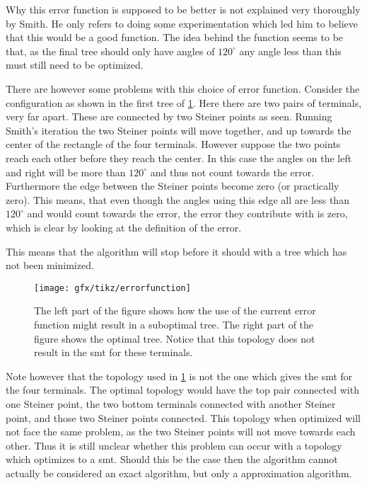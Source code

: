 Why this error function is supposed to be better is not explained very
thoroughly by Smith. He only refers to doing some experimentation which led him
to believe that this would be a good function. The idea behind the function
seems to be that, as the final tree should only have angles of $120^{\circ}$ any
angle less than this must still need to be optimized.

There are however some problems with this choice of error function. Consider
the configuration as shown in the first tree of \cref{fig:error-function}. Here
there are two pairs of terminals, very far apart. These are connected by two
Steiner points as seen. Running Smith's iteration the two Steiner points will
move together, and up towards the center of the rectangle of the four
terminals. However suppose the two points reach each other before they reach
the center. In this case the angles on the left and right will be more than
$120^{\circ}$ and thus not count towards the error. Furthermore the edge
between the Steiner points become zero (or practically zero). This means, that
even though the angles using this edge all are less than $120^{\circ}$ and would
count towards the error, the error they contribute with is zero, which is clear
by looking at the definition of the error.

This means that the algorithm will stop before it should with a tree which has
not been minimized.

\begin{figure}[htbp]
  \centering
  \texttt{[image: gfx/tikz/errorfunction]}
  \caption[Possible problem with the error function]{The left part of the figure
    shows how the use of the current error function might result in a suboptimal
    tree. The right part of the figure shows the optimal tree. Notice that
    this topology does not result in the \gls{smt} for these
    terminals.\label{fig:error-function}}
\end{figure}

Note however that the topology used in \cref{fig:error-function} is not the
one which gives the \gls{smt} for the four terminals. The optimal topology
would have the top pair connected with one Steiner point, the two bottom
terminals connected with another Steiner point, and those two Steiner points
connected. This topology when optimized will not face the same problem, as the
two Steiner points will not move towards each other. Thus it is still unclear
whether this problem can occur with a topology which optimizes to a \gls{smt}.
Should this be the case then the algorithm cannot actually be considered an
exact algorithm, but only a approximation algorithm.

